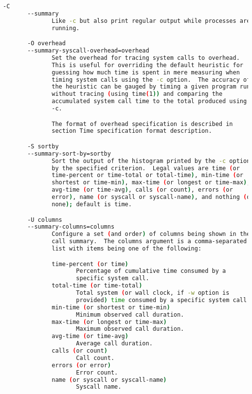 {{\begin{lstlisting}[language=bash]
       -C
       --summary
              Like -c but also print regular output while processes are
              running.

       -O overhead
       --summary-syscall-overhead=overhead
              Set the overhead for tracing system calls to overhead.
              This is useful for overriding the default heuristic for
              guessing how much time is spent in mere measuring when
              timing system calls using the -c option.  The accuracy of
              the heuristic can be gauged by timing a given program run
              without tracing (using time(1)) and comparing the
              accumulated system call time to the total produced using
              -c.

              The format of overhead specification is described in
              section Time specification format description.

       -S sortby
       --summary-sort-by=sortby
              Sort the output of the histogram printed by the -c option
              by the specified criterion.  Legal values are time (or
              time-percent or time-total or total-time), min-time (or
              shortest or time-min), max-time (or longest or time-max),
              avg-time (or time-avg), calls (or count), errors (or
              error), name (or syscall or syscall-name), and nothing (or
              none); default is time.

       -U columns
       --summary-columns=columns
              Configure a set (and order) of columns being shown in the
              call summary.  The columns argument is a comma-separated
              list with items being one of the following:

              time-percent (or time)
                     Percentage of cumulative time consumed by a
                     specific system call.
              total-time (or time-total)
                     Total system (or wall clock, if -w option is
                     provided) time consumed by a specific system call.
              min-time (or shortest or time-min)
                     Minimum observed call duration.
              max-time (or longest or time-max)
                     Maximum observed call duration.
              avg-time (or time-avg)
                     Average call duration.
              calls (or count)
                     Call count.
              errors (or error)
                     Error count.
              name (or syscall or syscall-name)
                     Syscall name.


\end{lstlisting}}}
